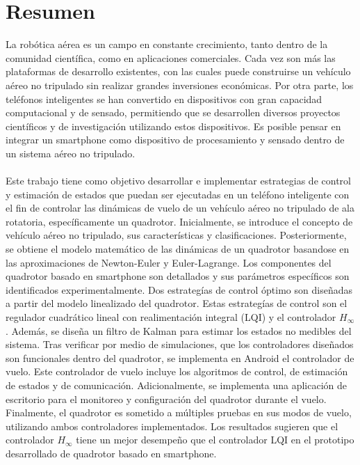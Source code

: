 \newpage
\thispagestyle{empty}
\mbox{}

\chapter*{Resumen} \label{resumen}
La robótica aérea es un campo en constante crecimiento, tanto dentro de la comunidad científica, como en aplicaciones comerciales. Cada vez son más las plataformas de desarrollo existentes, con las cuales puede construirse un vehículo aéreo no tripulado sin realizar grandes inversiones económicas. Por otra parte, los teléfonos inteligentes se han convertido en dispositivos con gran capacidad computacional y de sensado, permitiendo que se desarrollen diversos proyectos científicos y de investigación utilizando estos dispositivos. Es posible pensar en integrar un smartphone como dispositivo de procesamiento y sensado dentro de un sistema aéreo no tripulado. 
\\\\
Este trabajo tiene como objetivo desarrollar e implementar estrategias de control y estimación de estados que puedan ser ejecutadas en un teléfono inteligente con el fin de controlar las dinámicas de vuelo de un vehículo aéreo no tripulado de ala rotatoria, específicamente un quadrotor. Inicialmente, se introduce el concepto de vehículo aéreo no tripulado, sus características y clasificaciones. Posteriormente, se obtiene el modelo matemático de las dinámicas de un quadrotor basandose en las aproximaciones de Newton-Euler y Euler-Lagrange. Los componentes del quadrotor basado en smartphone son detallados y sus parámetros específicos son identificados experimentalmente. Dos estrategías de control óptimo son diseñadas a partir del modelo linealizado del quadrotor. Estas estrategías de control son el regulador cuadrático lineal con realimentación integral (LQI) y el controlador $H_\infty$. Además, se diseña un filtro de Kalman para estimar los estados no medibles del sistema. Tras verificar por medio de simulaciones, que los controladores diseñados son funcionales dentro del quadrotor, se implementa en Android el controlador de vuelo. Este controlador de vuelo incluye los algoritmos de control, de estimación de estados y de comunicación. Adicionalmente, se implementa una aplicación de escritorio para el monitoreo y configuración del quadrotor durante el vuelo. Finalmente, el quadrotor es sometido a múltiples pruebas en sus modos de vuelo, utilizando ambos controladores implementados. Los resultados sugieren que el controlador $H_\infty$ tiene un mejor desempeño que el controlador LQI en el prototipo desarrollado de quadrotor basado en smartphone.
\\\\
